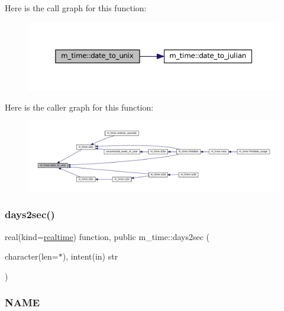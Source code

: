 Here is the call graph for this function\+:\nopagebreak
\begin{figure}[H]
\begin{center}
\leavevmode
\includegraphics[width=350pt]{namespacem__time_aed245c691853279ebf0ce899dec9caa9_cgraph}
\end{center}
\end{figure}
Here is the caller graph for this function\+:\nopagebreak
\begin{figure}[H]
\begin{center}
\leavevmode
\includegraphics[width=350pt]{namespacem__time_aed245c691853279ebf0ce899dec9caa9_icgraph}
\end{center}
\end{figure}
\mbox{\label{namespacem__time_a99393c7906f1989f90ece03969224938}} 
\subsubsection{\texorpdfstring{days2sec()}{days2sec()}}
{\footnotesize\ttfamily real(kind=\mbox{\hyperlink{namespacem__time_ac10ea9e8d59ec74eaa7d89f2517d7422}{realtime}}) function, public m\+\_\+time\+::days2sec (\begin{DoxyParamCaption}\item[{character(len=$\ast$), intent(in)}]{str }\end{DoxyParamCaption})}



\subsubsection*{N\+A\+ME}

